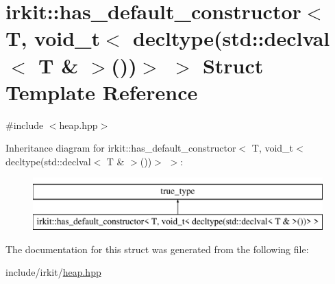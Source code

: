 \hypertarget{structirkit_1_1has__default__constructor_3_01T_00_01void__t_3_01decltype_07std_1_1declval_3_01T_01_6_01_4_07_08_08_4_01_4}{}\section{irkit\+:\+:has\+\_\+default\+\_\+constructor$<$ T, void\+\_\+t$<$ decltype(std\+:\+:declval$<$ T \& $>$())$>$ $>$ Struct Template Reference}
\label{structirkit_1_1has__default__constructor_3_01T_00_01void__t_3_01decltype_07std_1_1declval_3_01T_01_6_01_4_07_08_08_4_01_4}


{\ttfamily \#include $<$heap.\+hpp$>$}

Inheritance diagram for irkit\+:\+:has\+\_\+default\+\_\+constructor$<$ T, void\+\_\+t$<$ decltype(std\+:\+:declval$<$ T \& $>$())$>$ $>$\+:\begin{figure}[H]
\begin{center}
\leavevmode
\includegraphics[height=2.000000cm]{structirkit_1_1has__default__constructor_3_01T_00_01void__t_3_01decltype_07std_1_1declval_3_01T_01_6_01_4_07_08_08_4_01_4}
\end{center}
\end{figure}


The documentation for this struct was generated from the following file\+:\begin{DoxyCompactItemize}
\item 
include/irkit/\hyperlink{heap_8hpp}{heap.\+hpp}\end{DoxyCompactItemize}
